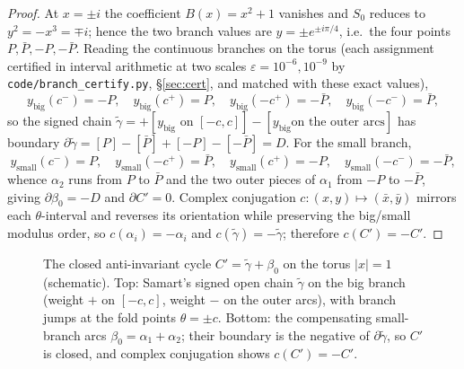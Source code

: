 \documentclass[11pt]{amsart}
\theoremstyle{definition}
\theoremstyle{remark}
\begin{document}
\begin{proof}
At $x=\pm i$ the coefficient $B(x)=x^2+1$ vanishes and $S_0$ reduces to
$y^2=-x^3=\mp i$; hence the two branch values are $y=\pm e^{\pm i\pi/4}$,
i.e.\ the four points $P,\bar P,-P,-\bar P$. Reading the continuous branches
on the torus (each assignment certified in interval arithmetic at two scales
$\varepsilon=10^{-6},10^{-9}$ by \texttt{code/branch\_certify.py},
\S\ref{sec:cert}, and matched with these exact values),
\[
  y_{\mathrm{big}}(c^-)=-P,\quad y_{\mathrm{big}}(c^+)=P,\quad
  y_{\mathrm{big}}(-c^+)=-\bar P,\quad y_{\mathrm{big}}(-c^-)=\bar P,
\]
so the signed chain
$\tilde\gamma=+[y_{\mathrm{big}}\text{ on }[-c,c]]-[y_{\mathrm{big}}\text{
on the outer arcs}]$ has boundary
$\partial\tilde\gamma=[P]-[\bar P]+[-P]-[-\bar P]=D$. For the small branch,
\[
  y_{\mathrm{small}}(c^-)=P,\quad y_{\mathrm{small}}(-c^+)=\bar P,\quad
  y_{\mathrm{small}}(c^+)=-P,\quad y_{\mathrm{small}}(-c^-)=-\bar P,
\]
whence $\alpha_2$ runs from $P$ to $\bar P$ and the two outer pieces of
$\alpha_1$ from $-P$ to $-\bar P$, giving
$\partial\beta_0=-D$ and $\partial C'=0$. Complex conjugation
$c:(x,y)\mapsto(\bar x,\bar y)$ mirrors each $\theta$-interval and reverses
its orientation while preserving the big/small modulus order, so
$c(\alpha_i)=-\alpha_i$ and $c(\tilde\gamma)=-\tilde\gamma$; therefore
$c(C')=-C'$.
\end{proof}

\begin{figure}[ht]
\centering
{}
\caption{The closed anti-invariant cycle $C'=\tilde\gamma+\beta_0$ on the
torus $|x|=1$ (schematic). Top: Samart's signed open chain $\tilde\gamma$ on
the big branch (weight $+$ on $[-c,c]$, weight $-$ on the outer arcs), with
branch jumps at the fold points $\theta=\pm c$. Bottom: the compensating
small-branch arcs $\beta_0=\alpha_1+\alpha_2$; their boundary is the negative
of $\partial\tilde\gamma$, so $C'$ is closed, and complex conjugation shows
$c(C')=-C'$.}
\label{fig:chain}
\end{figure}
\end{document}

